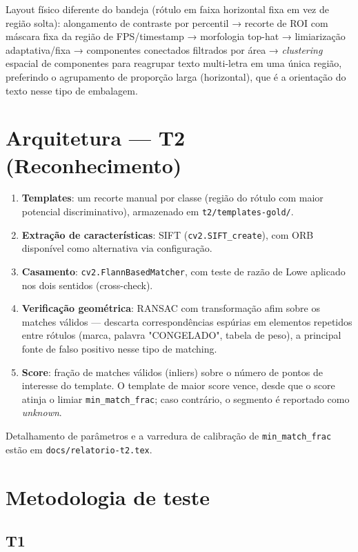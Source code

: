 \documentclass[a4paper,11pt]{article}
\begin{document}
Layout físico diferente do bandeja (rótulo em faixa horizontal fixa em vez de região solta):
alongamento de contraste por percentil → recorte de ROI com máscara fixa da região de
FPS/timestamp → morfologia top-hat → limiarização adaptativa/fixa → componentes conectados
filtrados por área → \emph{clustering} espacial de componentes para reagrupar texto
multi-letra em uma única região, preferindo o agrupamento de proporção larga (horizontal), que é
a orientação do texto nesse tipo de embalagem.

\section{Arquitetura --- T2 (Reconhecimento)}

\begin{enumerate}[nosep]
  \item \textbf{Templates}: um recorte manual por classe (região do rótulo com maior potencial
        discriminativo), armazenado em \texttt{t2/templates-gold/}.
  \item \textbf{Extração de características}: SIFT (\texttt{cv2.SIFT\_create}), com ORB
        disponível como alternativa via configuração.
  \item \textbf{Casamento}: \texttt{cv2.FlannBasedMatcher}, com teste de razão de Lowe aplicado
        nos dois sentidos (cross-check).
  \item \textbf{Verificação geométrica}: RANSAC com transformação afim sobre os matches válidos
        --- descarta correspondências espúrias em elementos repetidos entre rótulos (marca,
        palavra "CONGELADO", tabela de peso), a principal fonte de falso positivo nesse tipo de
        matching.
  \item \textbf{Score}: fração de matches válidos (inliers) sobre o número de pontos de
        interesse do template. O template de maior score vence, desde que o score atinja o
        limiar \texttt{min\_match\_frac}; caso contrário, o segmento é reportado como
        \emph{unknown}.
\end{enumerate}

Detalhamento de parâmetros e a varredura de calibração de \texttt{min\_match\_frac} estão em
\texttt{docs/relatorio-t2.tex}.

\section{Metodologia de teste}

\subsection{T1}
\end{document}
